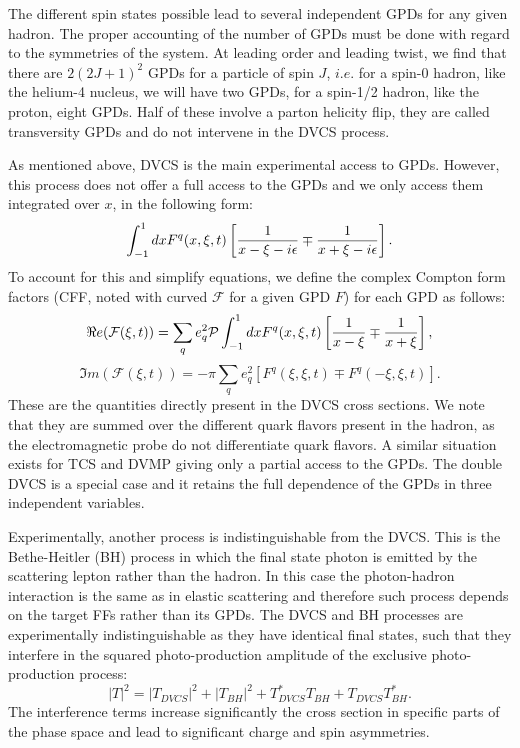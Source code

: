 \documentclass[aps,prc,preprint,superscriptaddress]{revtex4}
\begin{document}
The different spin states possible lead to several independent GPDs for 
any given hadron. The proper accounting of 
the number of GPDs must be done with regard to the symmetries of the system.
At leading order and leading twist, we find that there are $2(2J+1)^2$ GPDs for a particle of spin $J$, 
$i.e.$ for a spin-0 hadron, like the helium-4 nucleus, we will
have two GPDs, for a spin-1/2 hadron, like the proton, eight GPDs. Half of these involve a 
parton helicity flip, they are called transversity GPDs and do not intervene 
in the DVCS process. 

As mentioned above, DVCS is the main experimental access to GPDs. However, this process does not offer
a full access to the GPDs and we only access them integrated over $x$, in the following form:
\begin{equation}
	\int^1 _{-1} dx F^{q}(x,\xi,t) \left [ {1 \over x - \xi - i \epsilon} 
	                                   \mp {1 \over x + \xi - i \epsilon} \right]. 
\end{equation}
To account for this and simplify equations, we define the complex Compton form factors (CFF,
noted with curved $\mathcal{F}$ for a given GPD $F$) for each GPD as follows:
\begin{equation}
	\Re e (\mathcal{F}(\xi,t)) = \sum _q e^2_q \mathcal{P} \int^1_{-1} dx F^{q}(x,\xi,t)
	      \left [ {1 \over x - \xi} \mp {1 \over x + \xi} \right], 
\end{equation}
\begin{equation}
	\Im m (\mathcal{F}(\xi,t)) = - \pi \sum _q e^2_q \left [ F^{q}(\xi,\xi,t) \mp F^{q}(-\xi,\xi,t) \right]. 
\end{equation} 
These are the quantities directly present in the DVCS cross sections. We note that they are summed over
the different quark flavors present in the hadron, as the electromagnetic probe do not differentiate
quark flavors. A similar situation exists for TCS and DVMP giving only a partial access to the GPDs. 
The double DVCS is a special case and it retains the full
dependence of the GPDs in three independent variables.

Experimentally, another process is indistinguishable from the DVCS. This is the Bethe-Heitler (BH) 
process in which %
the final state photon is emitted by the scattering lepton rather than the hadron. In this case the 
photon-hadron interaction is the same as in elastic scattering and therefore such process depends on the
target FFs rather than its GPDs. The DVCS and BH processes are experimentally indistinguishable as they
have identical final states, such that they interfere in the squared photo-production amplitude of the
exclusive photo-production process:
\begin{equation}
	|T|^2 = |T_{DVCS}|^2 + |T_{BH}|^2 + T_{DVCS}^* T_{BH} + T_{DVCS}T_{BH}^*. 
\end{equation}
The interference terms increase significantly the cross section in specific parts of the phase space
and lead to significant charge and spin asymmetries. 
\end{document}
